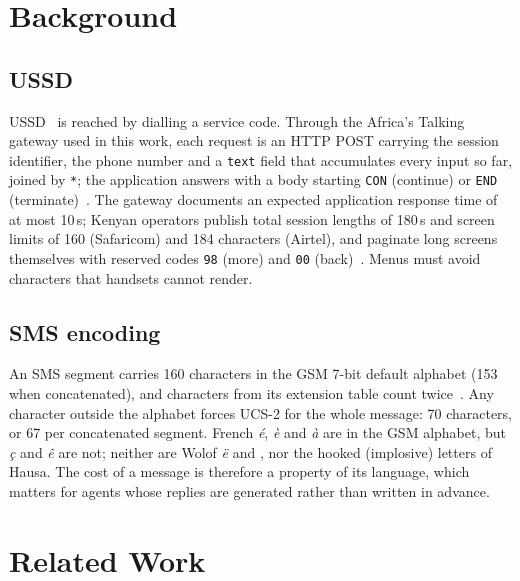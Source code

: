 \documentclass[conference]{IEEEtran}
\begin{document}
\section{Background}
\label{sec:background}

\subsection{USSD}
USSD~\cite{3gpp22090} is reached by dialling a service code. Through the
Africa's Talking gateway used in this work, each request is an HTTP POST
carrying the session identifier, the phone number and a \texttt{text} field
that accumulates every input so far, joined by \texttt{*}; the application
answers with a body starting \texttt{CON} (continue) or \texttt{END}
(terminate)~\cite{atdocs,atnode}. The gateway documents an expected
application response time of at most 10\,s; Kenyan operators publish total
session lengths of 180\,s and screen limits of 160 (Safaricom) and 184
characters (Airtel), and paginate long screens themselves with reserved codes
\texttt{98} (more) and \texttt{00} (back)~\cite{athelp}. Menus must avoid
characters that handsets cannot render.

\subsection{SMS encoding}
An SMS segment carries 160 characters in the GSM 7-bit default alphabet (153
when concatenated), and characters from its extension table count
twice~\cite{3gpp23038}. Any character outside the alphabet forces UCS-2 for
the whole message: 70 characters, or 67 per concatenated segment. French
\textit{\'e}, \textit{\`e} and \textit{\`a} are in the GSM alphabet, but
\textit{\c{c}} and \textit{\^e} are not; neither are Wolof \textit{\"e} and
\textit{\ng}, nor the hooked (implosive) letters of Hausa. The cost of a
message is therefore a property of its language, which matters for agents
whose replies are generated rather than written in advance.

\section{Related Work}
\label{sec:related}
\end{document}
